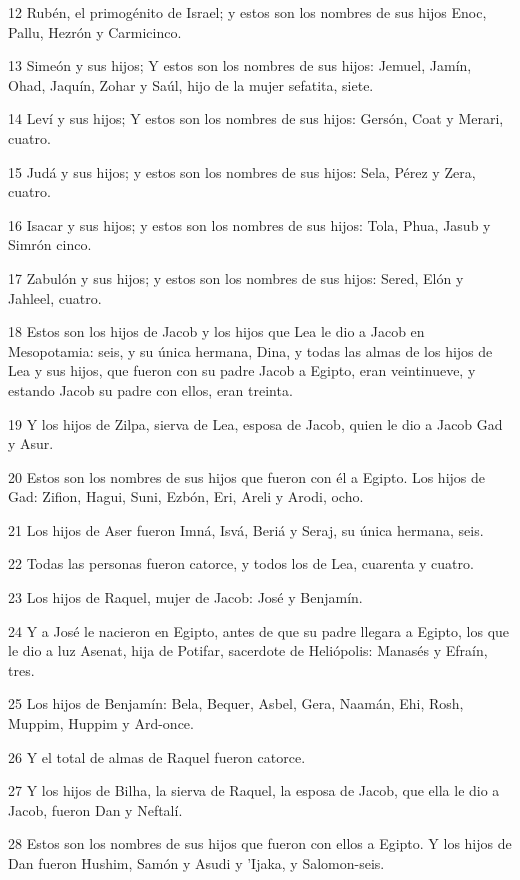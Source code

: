 \par 12 Rubén, el primogénito de Israel; y estos son los nombres de sus hijos Enoc, Pallu, Hezrón y Carmicinco.
\par 13 Simeón y sus hijos; Y estos son los nombres de sus hijos: Jemuel, Jamín, Ohad, Jaquín, Zohar y Saúl, hijo de la mujer sefatita, siete.
\par 14 Leví y sus hijos; Y estos son los nombres de sus hijos: Gersón, Coat y Merari, cuatro.
\par 15 Judá y sus hijos; y estos son los nombres de sus hijos: Sela, Pérez y Zera, cuatro.
\par 16 Isacar y sus hijos; y estos son los nombres de sus hijos: Tola, Phua, Jasub y Simrón cinco.
\par 17 Zabulón y sus hijos; y estos son los nombres de sus hijos: Sered, Elón y Jahleel, cuatro.
\par 18 Estos son los hijos de Jacob y los hijos que Lea le dio a Jacob en Mesopotamia: seis, y su única hermana, Dina, y todas las almas de los hijos de Lea y sus hijos, que fueron con su padre Jacob a Egipto, eran veintinueve, y estando Jacob su padre con ellos, eran treinta.
\par 19 Y los hijos de Zilpa, sierva de Lea, esposa de Jacob, quien le dio a Jacob Gad y Asur.
\par 20 Estos son los nombres de sus hijos que fueron con él a Egipto. Los hijos de Gad: Zifion, Hagui, Suni, Ezbón, Eri, Areli y Arodi, ocho.
\par 21 Los hijos de Aser fueron Imná, Isvá, Beriá y Seraj, su única hermana, seis.
\par 22 Todas las personas fueron catorce, y todos los de Lea, cuarenta y cuatro.
\par 23 Los hijos de Raquel, mujer de Jacob: José y Benjamín.
\par 24 Y a José le nacieron en Egipto, antes de que su padre llegara a Egipto, los que le dio a luz Asenat, hija de Potifar, sacerdote de Heliópolis: Manasés y Efraín, tres.
\par 25 Los hijos de Benjamín: Bela, Bequer, Asbel, Gera, Naamán, Ehi, Rosh, Muppim, Huppim y Ard-once.
\par 26 Y el total de almas de Raquel fueron catorce.
\par 27 Y los hijos de Bilha, la sierva de Raquel, la esposa de Jacob, que ella le dio a Jacob, fueron Dan y Neftalí.
\par 28 Estos son los nombres de sus hijos que fueron con ellos a Egipto. Y los hijos de Dan fueron Hushim, Samón y Asudi y 'Ijaka, y Salomon-seis.
